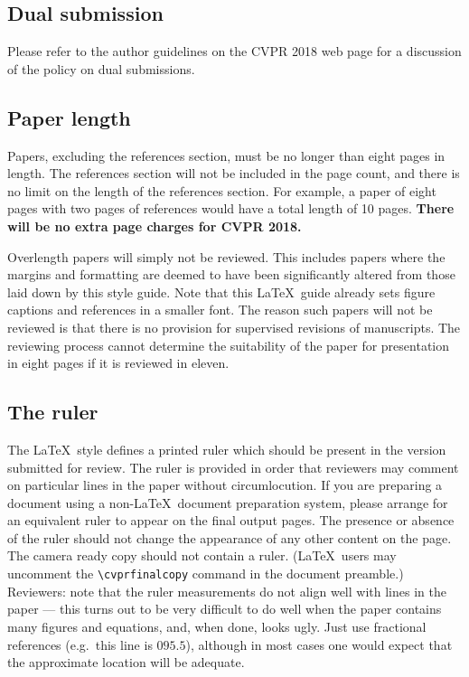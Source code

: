 \documentclass[10pt,twocolumn,letterpaper]{article}
\begin{document}
\subsection{Dual submission}

Please refer to the author guidelines on the CVPR 2018 web page for a
discussion of the policy on dual submissions.

\subsection{Paper length}
Papers, excluding the references section,
must be no longer than eight pages in length. The references section
will not be included in the page count, and there is no limit on the
length of the references section. For example, a paper of eight pages
with two pages of references would have a total length of 10 pages.
{\bf There will be no extra page charges for
  CVPR 2018.}

Overlength papers will simply not be reviewed.  This includes papers
where the margins and formatting are deemed to have been significantly
altered from those laid down by this style guide.  Note that this
\LaTeX\ guide already sets figure captions and references in a smaller font.
The reason such papers will not be reviewed is that there is no provision for
supervised revisions of manuscripts.  The reviewing process cannot determine
the suitability of the paper for presentation in eight pages if it is
reviewed in eleven.  

\subsection{The ruler}
The \LaTeX\ style defines a printed ruler which should be present in the
version submitted for review.  The ruler is provided in order that
reviewers may comment on particular lines in the paper without
circumlocution.  If you are preparing a document using a non-\LaTeX\
document preparation system, please arrange for an equivalent ruler to
appear on the final output pages.  The presence or absence of the ruler
should not change the appearance of any other content on the page.  The
camera ready copy should not contain a ruler. (\LaTeX\ users may uncomment
the \verb'\cvprfinalcopy' command in the document preamble.)  Reviewers:
note that the ruler measurements do not align well with lines in the paper
--- this turns out to be very difficult to do well when the paper contains
many figures and equations, and, when done, looks ugly.  Just use fractional
references (e.g.\ this line is $095.5$), although in most cases one would
expect that the approximate location will be adequate.
\end{document}
